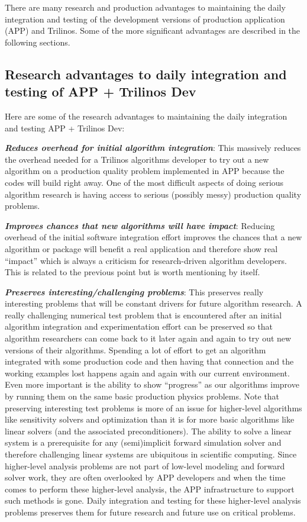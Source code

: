 \documentclass[pdf,ps2pdf,11pt]{SANDreport}
\begin{document}
There are many research and production advantages to maintaining the daily
integration and testing of the development versions of production application
(APP) and Trilinos.  Some of the more significant advantages are described in
the following sections.


%
{}\subsection{Research advantages to daily integration and testing of APP +
Trilinos Dev}
%

Here are some of the research advantages to maintaining the daily integration
and testing APP + Trilinos Dev:

{}\textit{\textbf{Reduces overhead for initial algorithm integration}}: This
massively reduces the overhead needed for a Trilinos algorithms developer to
try out a new algorithm on a production quality problem implemented in APP
because the codes will build right away.  One of the most difficult aspects of
doing serious algorithm research is having access to serious (possibly messy)
production quality problems.

{}\textit{\textbf{Improves chances that new algorithms will have impact}}:
Reducing overhead of the initial software integration effort improves the
chances that a new algorithm or package will benefit a real application and
therefore show real ``impact'' which is always a criticism for research-driven
algorithm developers.  This is related to the previous point but is worth
mentioning by itself.

{}\textit{\textbf{Preserves interesting/challenging problems}}: This preserves
really interesting problems that will be constant drivers for future algorithm
research.  A really challenging numerical test problem that is encountered
after an initial algorithm integration and experimentation effort can be
preserved so that algorithm researchers can come back to it later again and
again to try out new versions of their algorithms.  Spending a lot of effort
to get an algorithm integrated with some production code and then having that
connection and the working examples lost happens again and again with our
current environment.  Even more important is the ability to show ``progress''
as our algorithms improve by running them on the same basic production physics
problems.  Note that preserving interesting test problems is more of an issue
for higher-level algorithms like sensitivity solvers and optimization than it
is for more basic algorithms like linear solvers (and the associated
preconditioners).  The ability to solve a linear system is a prerequisite for
any (semi)implicit forward simulation solver and therefore challenging linear
systems are ubiquitous in scientific computing.  Since higher-level analysis
problems are not part of low-level modeling and forward solver work, they are
often overlooked by APP developers and when the time comes to perform these
higher-level analysis, the APP infrastructure to support such methods is gone.
Daily integration and testing for these higher-level analysis problems preserves
them for future research and future use on critical problems.
\end{document}
